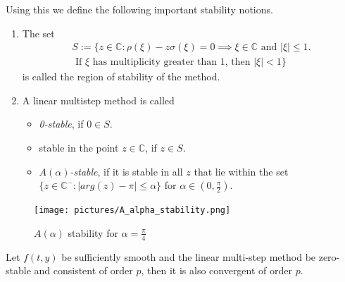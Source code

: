 	
	Using this we define the following important stability notions.
	\begin{definition}
		\begin{enumerate}
			\item 
			The set
			\begin{equation}
				\begin{aligned}
					S := \{z \in \mathbb{C} : \rho(\xi) - z \sigma(\xi) = 0 \implies \xi \in \mathbb{C} \text{ and } |\xi| \leq 1. \\
					\text{ If $\xi$ has multiplicity greater than $1$, then } |\xi| < 1\}
				\end{aligned}
			\end{equation}
			is called the region of stability of the method.
			\item 
			A linear multistep method is called
			\begin{itemize}
				\item \emph{0-stable}, if $0 \in S$.
				\item stable in the point $z \in \mathbb{C}$, if $z \in S$.
				\item \emph{$A(\alpha)$-stable}, if it is stable in all $z$ that lie within the set $\{z \in \mathbb{C}^- : |arg(z)-\pi| \leq \alpha\}$ for $\alpha \in (0, \frac{\pi}{2})$.		 
			\end{itemize}
		\end{enumerate}
	\end{definition}
	
	
	\begin{figure}[H]
		\centering
		\texttt{[image: pictures/A\_alpha\_stability.png]}
		\caption{$A(\alpha)$ stability for $\alpha = \frac{\pi}{4}$}
		\label{fig:A of alpha stability}
	\end{figure}
	
	\begin{theorem}
		\label{th: null-stbaility and consistence is convergence}
		Let $f(t,y)$ be sufficiently smooth and the linear multi-step method be zero-stable and consistent of order $p$, then it is also convergent of order $p$.
	\end{theorem}
	
	
